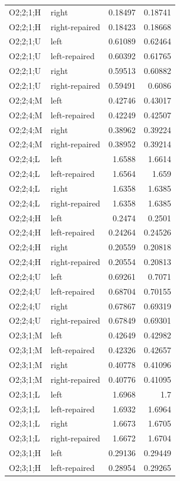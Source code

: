 {\begin{longtable}{@{}llrr@{}}
O2;2;1;H & right & 0.18497 & 0.18741 \\
O2;2;1;H & right-repaired & 0.18423 & 0.18668 \\
O2;2;1;U & left & 0.61089 & 0.62464 \\
O2;2;1;U & left-repaired & 0.60392 & 0.61765 \\
O2;2;1;U & right & 0.59513 & 0.60882 \\
O2;2;1;U & right-repaired & 0.59491 & 0.6086 \\
O2;2;4;M & left & 0.42746 & 0.43017 \\
O2;2;4;M & left-repaired & 0.42249 & 0.42507 \\
O2;2;4;M & right & 0.38962 & 0.39224 \\
O2;2;4;M & right-repaired & 0.38952 & 0.39214 \\
O2;2;4;L & left & 1.6588 & 1.6614 \\
O2;2;4;L & left-repaired & 1.6564 & 1.659 \\
O2;2;4;L & right & 1.6358 & 1.6385 \\
O2;2;4;L & right-repaired & 1.6358 & 1.6385 \\
O2;2;4;H & left & 0.2474 & 0.2501 \\
O2;2;4;H & left-repaired & 0.24264 & 0.24526 \\
O2;2;4;H & right & 0.20559 & 0.20818 \\
O2;2;4;H & right-repaired & 0.20554 & 0.20813 \\
O2;2;4;U & left & 0.69261 & 0.7071 \\
O2;2;4;U & left-repaired & 0.68704 & 0.70155 \\
O2;2;4;U & right & 0.67867 & 0.69319 \\
O2;2;4;U & right-repaired & 0.67849 & 0.69301 \\
O2;3;1;M & left & 0.42649 & 0.42982 \\
O2;3;1;M & left-repaired & 0.42326 & 0.42657 \\
O2;3;1;M & right & 0.40778 & 0.41096 \\
O2;3;1;M & right-repaired & 0.40776 & 0.41095 \\
O2;3;1;L & left & 1.6968 & 1.7 \\
O2;3;1;L & left-repaired & 1.6932 & 1.6964 \\
O2;3;1;L & right & 1.6673 & 1.6705 \\
O2;3;1;L & right-repaired & 1.6672 & 1.6704 \\
O2;3;1;H & left & 0.29136 & 0.29449 \\
O2;3;1;H & left-repaired & 0.28954 & 0.29265 \\

\end{longtable}}
